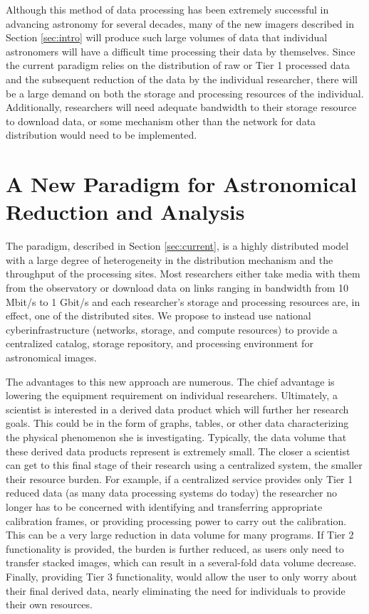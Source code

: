 \documentclass[10pt,conference]{IEEEtran}
\begin{document}
Although this method of data processing has been extremely successful in advancing astronomy for several decades, many of the new imagers described in Section \ref{sec:intro} will produce such large volumes of data that individual astronomers will have a difficult time processing their data by themselves. Since the current paradigm relies on the distribution of raw or Tier 1 processed data and the subsequent reduction of the data by the individual researcher, there will be a large demand on both the storage and processing resources of the individual. Additionally, researchers will need adequate bandwidth to their storage resource to download data, or some mechanism other than the network for data distribution would need to be implemented. 

\section{A New Paradigm for Astronomical Reduction and Analysis}\label{sec:rev}

The paradigm, described in Section \ref{sec:current}, is a highly distributed model with a large degree of heterogeneity in the distribution mechanism and the throughput of the processing sites. Most researchers either take media with them from the observatory or download data on links ranging in bandwidth from 10 Mbit/s to 1 Gbit/s and each researcher's storage and processing resources are, in effect, one of the distributed sites. We propose to instead use national cyberinfrastructure (networks, storage, and compute resources) to provide a centralized catalog, storage repository, and processing environment for astronomical images. 

The advantages to this new approach are numerous. The chief advantage is lowering the equipment requirement on individual researchers. Ultimately, a scientist is interested in a derived data product which will further her research goals. This could be in the form of graphs, tables, or other data characterizing the physical phenomenon she is investigating. Typically, the data volume that these derived data products represent is extremely small. The closer a scientist can get to this final stage of their research using a centralized system, the smaller their resource burden. For example, if a centralized service provides only Tier 1 reduced data (as many data processing systems do today) the researcher no longer has to be concerned with identifying and transferring appropriate calibration frames, or providing processing power to carry out the calibration. This can be a very large reduction in data volume for many programs. If Tier 2 functionality is provided, the burden is further reduced, as users only need to transfer stacked images, which can result in a several-fold data volume decrease. Finally, providing Tier 3 functionality, would allow the user to only worry about their final derived data, nearly eliminating the need for individuals to provide their own resources. 
\end{document}
